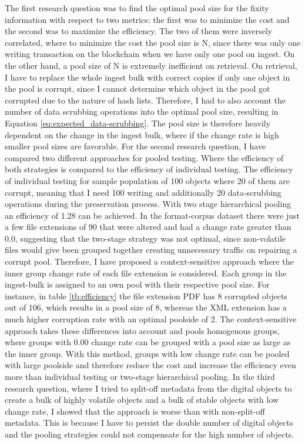 \documentclass[final]{vutinfth}
\begin{document}
The first research question was to find the optimal pool size for the fixity information with respect to two metrics: the first was to minimize the cost and the second was to maximize the efficiency. The two of them were inversely correlated, where to minimize the cost the pool size is N, since there was only one writing transaction on the blockchain when we have only one pool on ingest. On the other hand, a pool size of N is extremely inefficient on retrieval. On retrieval, I have to replace the whole ingest bulk with correct copies if only one object in the pool is corrupt, since I cannot determine which object in the pool got corrupted due to the nature of hash lists. Therefore, I had to also account the number of data scrubbing operations into the optimal pool size, resulting in Equation \ref{eq:expected_data-scrubbing}. The pool size is therefore heavily dependent on the change in the ingest bulk, where if the change rate is high smaller pool sizes are favorable.
For the second research question, I have compared two different approaches for pooled testing. Where the efficiency of both strategies is compared to the efficiency of individual testing. The efficiency of individual testing for sample population of 100 objects where 20 of them are corrupt, meaning that I need 100 writing and additionally 20 data-scrubbing operations during the preservation process. With two stage hierarchical pooling an efficiency of 1.28 can be achieved. In the format-corpus dataset there were just a few file extensions of 90 that were altered and had a change rate greater than 0.0, suggesting that the two-stage strategy was not optimal, since non-volatile files would give been grouped together creating unnecessary traffic on repairing a corrupt pool. Therefore, I have proposed a context-sensitive approach where the inner group change rate of each file extension is considered. Each group in the ingest-bulk is assigned to an own pool with their respective pool size. For instance, in table \ref{tb:efficiency} the file extension PDF has 8 corrupted objects out of 106, which results in a pool size of 8, whereas the XML extension has a much higher corruption rate with an optimal poolside of 2. The context-sensitive approach takes these differences into account and pools homogenous groups, where groups with 0.00 change rate can be grouped with a pool size as large as the inner group. With this method, groups with low change rate can be pooled with large poolside and therefore reduce the cost and increase the efficiency even more than individual testing or two-stage hierarchical pooling.
In the third research question, where I tried to split-off metadata from the digital objects to create a bulk of highly volatile objects and a bulk of stable objects with low change rate, I showed that the approach is worse than with non-split-off metadata. This is because I have to persist the double number of digital objects and the pooling strategies could not compensate for the high number of objects.
\end{document}
